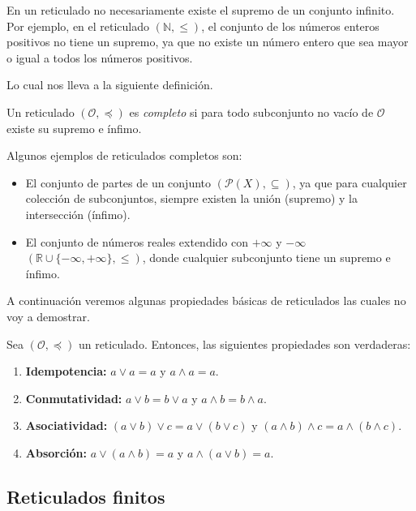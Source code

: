 \begin{remark}
    En un reticulado no necesariamente existe el supremo de un conjunto infinito. Por ejemplo, en el reticulado $(\mathbb{N}, \leq)$, el conjunto de los números enteros positivos no tiene un supremo, ya que no existe un número entero que sea mayor o igual a todos los números positivos.
\end{remark}

Lo cual nos lleva a la siguiente definición.

\begin{definition}
    Un reticulado $(\mathcal{O}, \preceq)$ es \emph{completo} si para todo subconjunto no vacío de $\mathcal{O}$ existe su supremo e ínfimo.
\end{definition}

Algunos ejemplos de reticulados completos son:
\begin{itemize}
    \item El conjunto de partes de un conjunto $(\mathcal{P}(X), \subseteq)$, ya que para cualquier colección de subconjuntos, siempre existen la unión (supremo) y la intersección (ínfimo).
    \item El conjunto de números reales extendido con $+\infty$ y $-\infty$ $(\mathbb{R} \cup \{-\infty, +\infty\}, \leq)$, donde cualquier subconjunto tiene un supremo e ínfimo.
\end{itemize}

A continuación veremos algunas propiedades básicas de reticulados las cuales no voy a demostrar.

\begin{proposition}
    Sea $(\mathcal{O}, \preceq)$ un reticulado. Entonces, las siguientes propiedades son verdaderas:
    \begin{enumerate}
        \item \textbf{Idempotencia:} $a \vee a = a$ y $a \wedge a = a$.
        \item \textbf{Conmutatividad:} $a \vee b = b \vee a$ y $a \wedge b = b \wedge a$.
        \item \textbf{Asociatividad:} $(a \vee b) \vee c = a \vee (b \vee c)$ y $(a \wedge b) \wedge c = a \wedge (b \wedge c)$.
        \item \textbf{Absorción:} $a \vee (a \wedge b) = a$ y $a \wedge (a \vee b) = a$.
    \end{enumerate}
\end{proposition}

\subsection{Reticulados finitos}

